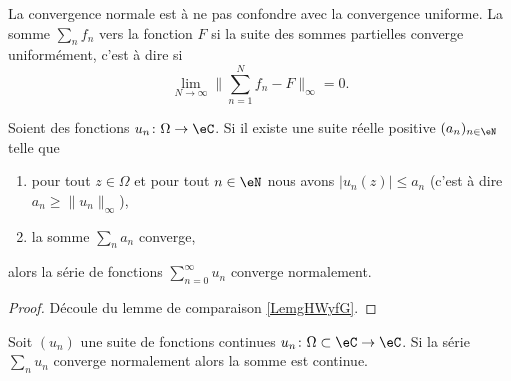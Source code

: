 La convergence normale est à ne pas confondre avec la convergence uniforme. La somme \( \sum_nf_n\)  vers la fonction \( F\) si la suite des sommes partielles converge uniformément, c'est à dire si 
\begin{equation}
    \lim_{N\to \infty} \| \sum_{n=1}^Nf_n-F \|_{\infty}=0.
\end{equation}

\begin{lemma}
    Soient des fonctions \( u_n\colon \Omega\to \eC\). Si il existe une suite réelle positive \( (a_n)_{n\in \eN}\) telle que
    \begin{enumerate}
        \item
            pour tout \( z\in \Omega\) et pour tout \( n\in \eN\) nous avons \( | u_n(z) |\leq a_n\) (c'est à dire \( a_n\geq \| u_n \|_{\infty}\)),
        \item
            la somme \( \sum_{n}a_n\) converge,
    \end{enumerate}
    alors la série de fonctions \( \sum_{n=0}^{\infty}u_n\) converge normalement.
\end{lemma}

\begin{proof}
    Découle du lemme de comparaison \ref{LemgHWyfG}.
\end{proof}

\begin{proposition}     \label{PropUEMoNF}
    Soit \( (u_n)\) une suite de fonctions continues \( u_n\colon \Omega\subset\eC\to \eC\). Si la série \( \sum_nu_n\) converge normalement alors la somme est continue.
\end{proposition}

